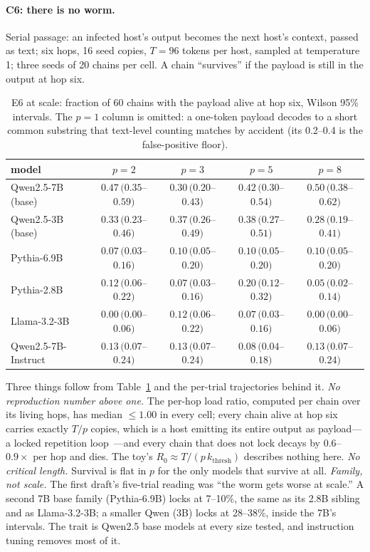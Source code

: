 \documentclass[11pt]{article}
\theoremstyle{plain}
\theoremstyle{definition}
\theoremstyle{remark}
\begin{document}
\paragraph{C6: there is no worm.}\label{sec:e6scale}
Serial passage: an infected host's output becomes the next host's context, passed as text;
six hops, 16 seed copies, $T{=}96$ tokens per host, sampled at temperature 1; three seeds of 20
chains per cell. A chain ``survives'' if the payload is still in the output at hop six.

\begin{table}[h]
\centering\small
\begin{tabular}{lcccc}
\toprule
model & $p{=}2$ & $p{=}3$ & $p{=}5$ & $p{=}8$ \\
\midrule
Qwen2.5-7B (base)     & $0.47\,(0.35$--$0.59)$ & $0.30\,(0.20$--$0.43)$ & $0.42\,(0.30$--$0.54)$ & $0.50\,(0.38$--$0.62)$ \\
Qwen2.5-3B (base)     & $0.33\,(0.23$--$0.46)$ & $0.37\,(0.26$--$0.49)$ & $0.38\,(0.27$--$0.51)$ & $0.28\,(0.19$--$0.41)$ \\
Pythia-6.9B           & $0.07\,(0.03$--$0.16)$ & $0.10\,(0.05$--$0.20)$ & $0.10\,(0.05$--$0.20)$ & $0.10\,(0.05$--$0.20)$ \\
Pythia-2.8B           & $0.12\,(0.06$--$0.22)$ & $0.07\,(0.03$--$0.16)$ & $0.20\,(0.12$--$0.32)$ & $0.05\,(0.02$--$0.14)$ \\
Llama-3.2-3B          & $0.00\,(0.00$--$0.06)$ & $0.12\,(0.06$--$0.22)$ & $0.07\,(0.03$--$0.16)$ & $0.00\,(0.00$--$0.06)$ \\
Qwen2.5-7B-Instruct   & $0.13\,(0.07$--$0.24)$ & $0.13\,(0.07$--$0.24)$ & $0.08\,(0.04$--$0.18)$ & $0.13\,(0.07$--$0.24)$ \\
\bottomrule
\end{tabular}
\caption{E6 at scale: fraction of 60 chains with the payload alive at hop six, Wilson 95\%
intervals. The $p{=}1$ column is omitted: a one-token payload decodes to a short common
substring that text-level counting matches by accident (its 0.2--0.4 is the false-positive
floor).}
\label{tab:e6scale}
\end{table}

Three things follow from Table~\ref{tab:e6scale} and the per-trial trajectories behind it.
\emph{No reproduction number above one.} The per-hop load ratio, computed per chain over its
living hops, has median $\le1.00$ in every cell; every chain alive at hop six carries exactly
$T/p$ copies, which is a host emitting its entire output as payload---a locked repetition
loop~\cite{holtzman2019,xu2022}---and every chain that does not lock decays by $0.6$--$0.9\times$
per hop and dies. The toy's $R_0\approx T/(p\,k_{\mathrm{thresh}})$ describes nothing here.
\emph{No critical length.} Survival is flat in $p$ for the only models that survive at all.
\emph{Family, not scale.} The first draft's five-trial reading was ``the worm gets worse at
scale.'' A second 7B base family (Pythia-6.9B) locks at 7--10\%, the same as its 2.8B sibling
and as Llama-3.2-3B; a smaller Qwen (3B) locks at 28--38\%, inside the 7B's intervals. The
trait is Qwen2.5 base models at every size tested, and instruction tuning removes most of it.
\end{document}
